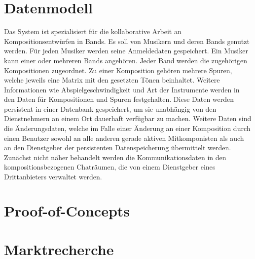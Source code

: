 \documentclass[12pt]{scrartcl}
\begin{document}

\section{Datenmodell}




Das System ist spezialisiert für die kollaborative Arbeit an Kompositionsentwürfen in Bands. Es soll von Musikern und deren Bands genutzt werden. Für jeden Musiker werden seine Anmeldedaten gespeichert. Ein Musiker kann einer oder mehreren Bands angehören. Jeder Band werden die zugehörigen Kompositionen zugeordnet. Zu einer Komposition gehören mehrere Spuren, welche jeweils eine Matrix mit den gesetzten Tönen beinhaltet. Weitere Informationen wie Abspielgeschwindigkeit und Art der Instrumente werden in den Daten für Kompositionen und Spuren festgehalten. Diese Daten werden persistent in einer Datenbank gespeichert, um sie unabhängig von den Dienstnehmern an einem Ort dauerhaft verfügbar zu machen.
Weitere Daten sind die Änderungsdaten, welche im Falle einer Änderung an einer Komposition durch einen Benutzer sowohl an alle anderen gerade aktiven Mitkomponisten als auch an den Dienstgeber der persistenten Datenspeicherung übermittelt werden.
Zunächst nicht näher behandelt werden die Kommunikationsdaten in den kompositionsbezogenen Chaträumen, die von einem Dienstgeber eines Drittanbieters verwaltet werden.



\section{Proof-of-Concepts}



















\section{Marktrecherche}
\end{document}
